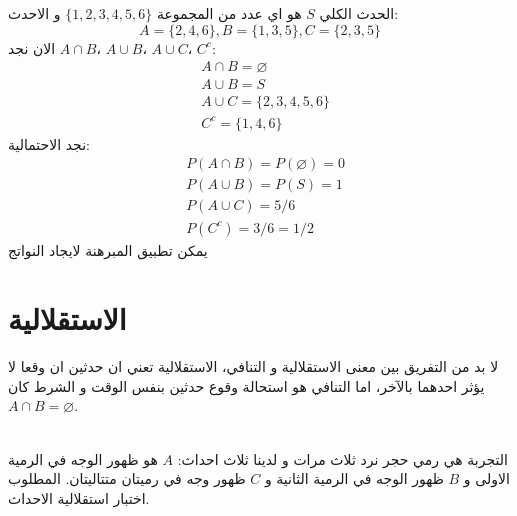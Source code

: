 \begin{solution}
	الحدث الكلي \(S\) هو اي عدد من المجموعة \(\{1, 2, 3, 4, 5, 6\}\) و الاحدث:
	\[
	A = \{2,4,6\}, B = \{1,3,5\}, C=\{2,3,5\}
	\]
	الان نجد \(A\cap B\)، \(A\cup B\)، \(A\cup C\)، \(C^c\):
	\begin{align*}
		&A\cap B = \varnothing\\
		&A\cup B = S\\
		&A \cup C = \{2,3,4,5,6\}\\
		&C^c = \{1,4,6\}		
	\end{align*}
	نجد الاحتمالية:
	\begin{align*}
		& P(A\cap B) = P(\varnothing) = 0\\
		& P(A\cup B) = P(S) = 1\\
		& P(A \cup C) = 5/6 \\
		& P(C^c) = 3/6 = 1/2
	\end{align*}
	يمكن تطبيق المبرهنة لايجاد النواتج 
\end{solution}

\section{الاستقلالية }

\begin{definition}
\end{definition}
لا بد من التفريق بين معنى الاستقلالية و التنافي، الاستقلالية تعني ان حدثين ان وقعا لا يؤثر احدهما بالآخر، اما التنافي هو استحالة وقوع حدثين بنفس الوقت و الشرط كان \(A\cap B=\varnothing\).

\begin{example}
	\\
	التجربة هي رمي حجر نرد ثلاث مرات و لدينا ثلاث احداث: \(A\) هو ظهور الوجه في الرمية الاولى و \(B\) ظهور الوجه في الرمية الثانية و \(C\) ظهور وجه في رميتان متتاليتان. المطلوب اختبار استقلالية الاحداث.
\end{example}  

